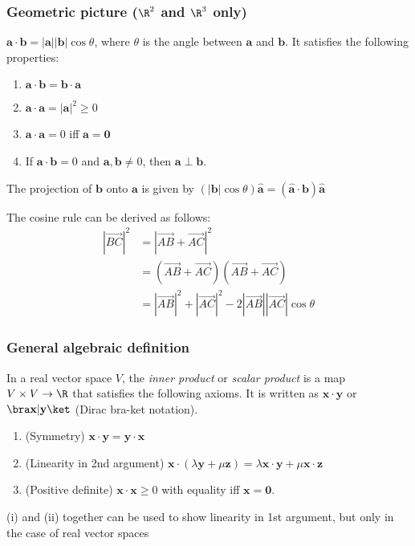\documentclass[a4paper]{article}
\begin{document}
\subsubsection{Geometric picture (\texorpdfstring{$\R^2$}{R2} and \texorpdfstring{$\R^3$}{R3} only)}
\begin{defi}
  $\mathbf{a}\cdot\mathbf{b} = \mathbf{|a||b|}\cos\theta$, where $\theta$ is the angle between $\mathbf{a}$ and $\mathbf{b}$. It satisfies the following properties:
  \begin{enumerate}
    \item $\mathbf{a\cdot b = b\cdot a}$
    \item $\mathbf{a\cdot a = |a|}^2 \geq 0$
    \item $\mathbf{a\cdot a} = 0$ iff $\mathbf{a = 0}$
    \item If $\mathbf{a\cdot b} = 0$ and $\mathbf{a, b}\not= 0$, then $\mathbf{a \perp b}$.
  \end{enumerate}
\end{defi}

The projection of $\mathbf{b}$ onto $\mathbf{a}$ is given by $(|\mathbf{b}|\cos\theta)\hat{\mathbf{a}} = \mathbf{(\hat{a}\cdot b)\hat{a}}$

The cosine rule can be derived as follows:
\begin{align*}
  |\overrightarrow{BC}|^2 &= |\overrightarrow{AB} + \overrightarrow{AC}|^2\\
  &= (\overrightarrow{AB} + \overrightarrow{AC})(\overrightarrow{AB} + \overrightarrow{AC})\\
  &= |\overrightarrow{AB}|^2 + |\overrightarrow{AC}|^2 - 2|\overrightarrow{AB}||\overrightarrow{AC}|\cos\theta
\end{align*}

\subsubsection{General algebraic definition}
\begin{defi}
  In a real vector space $V$, the \emph{inner product} or \emph{scalar product} is a map $V\times V\to \R$ that satisfies the following axioms. It is written as $\mathbf{x\cdot y}$ or $\bra\mathbf{x|y}\ket$ (Dirac bra-ket notation).
  \begin{enumerate}
    \item (Symmetry) $\mathbf{x\cdot y = y\cdot x}$
    \item (Linearity in 2nd argument) $\mathbf{x}\cdot (\lambda\mathbf{y} + \mu\mathbf{z}) = \lambda\mathbf{x\cdot y} + \mu\mathbf{x\cdot z}$
    \item (Positive definite) $\mathbf{x\cdot x}\geq 0$ with equality iff $\mathbf{x = 0}$.
  \end{enumerate}
\end{defi}
\note (i) and (ii) together can be used to show linearity in 1st argument, but only in the case of real vector spaces 
\end{document}
